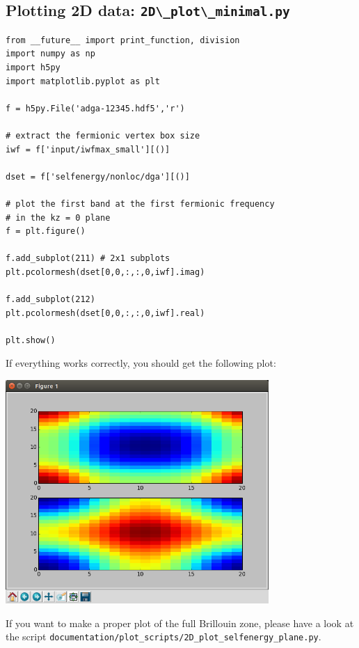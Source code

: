 \documentclass[a4paper,11pt]{article}
\numberwithin{equation}{section} %
\begin{document}
\newpage
\subsection*{Plotting 2D data: \protect\Verb+2D\_plot\_minimal.py+}
\begin{verbatim}
from __future__ import print_function, division
import numpy as np
import h5py
import matplotlib.pyplot as plt

f = h5py.File('adga-12345.hdf5','r')

# extract the fermionic vertex box size
iwf = f['input/iwfmax_small'][()]

dset = f['selfenergy/nonloc/dga'][()]

# plot the first band at the first fermionic frequency
# in the kz = 0 plane
f = plt.figure()

f.add_subplot(211) # 2x1 subplots
plt.pcolormesh(dset[0,0,:,:,0,iwf].imag)

f.add_subplot(212)
plt.pcolormesh(dset[0,0,:,:,0,iwf].real)

plt.show()
\end{verbatim}

If everything works correctly, you should get the following plot:\\
\begin{center}
\includegraphics[width=0.75\textwidth]{se-plane.png}\\
\end{center}
If you want to make a proper plot of the full Brillouin zone, please
have a look at the script \verb=documentation/plot_scripts/2D_plot_selfenergy_plane.py=.
\end{document}
